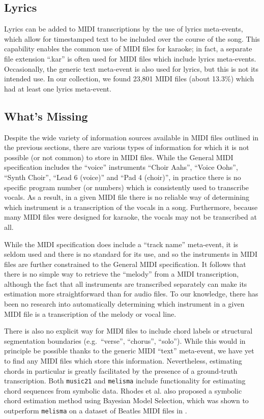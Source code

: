 \documentclass{article}
\begin{document}
\subsection{Lyrics}

Lyrics can be added to MIDI transcriptions by the use of lyrics meta-events, which allow for timestamped text to be included over the course of the song.
This capability enables the common use of MIDI files for karaoke; in fact, a separate file extension ``.kar'' is often used for MIDI files which include lyrics meta-events.
Occasionally, the generic text meta-event is also used for lyrics, but this is not its intended use.
In our collection, we found 23,801 MIDI files (about 13.3\%) which had at least one lyrics meta-event.

\subsection{What's Missing}
\label{sec:missing}

Despite the wide variety of information sources available in MIDI files outlined in the previous sections, there are various types of information for which it is not possible (or not common) to store in MIDI files.
While the General MIDI specification includes the ``voice'' instruments ``Choir Aahs'', ``Voice Oohs'', ``Synth Choir'', ``Lead 6 (voice)'' and ``Pad 4 (choir)'', in practice there is no specific program number (or numbers) which is consistently used to transcribe vocals.
As a result, in a given MIDI file there is no reliable way of determining which instrument is a transcription of the vocals in a song.
Furthermore, because many MIDI files were designed for karaoke, the vocals may not be transcribed at all.

While the MIDI specification does include a ``track name'' meta-event, it is seldom used and there is no standard for its use, and so the instruments in MIDI files are further constrained to the General MIDI specification.
It follows that there is no simple way to retrieve the ``melody'' from a MIDI transcription, although the fact that all instruments are transcribed separately can make its estimation more straightforward than for audio files.
To our knowledge, there has been no research into automatically determining which instrument in a given MIDI file is a transcription of the melody or vocal line.

There is also no explicit way for MIDI files to include chord labels or structural segmentation boundaries (e.g.\ ``verse'', ``chorus'', ``solo'').
While this would in principle be possible thanks to the generic MIDI ``text'' meta-event, we have yet to find any MIDI files which store this information.
Nevertheless, estimating chords in particular is greatly facilitated by the presence of a ground-truth transcription.
Both \texttt{music21} \cite{cuthbert2010music21} and \texttt{melisma} \cite{sleator2001melisma} include functionality for estimating chord sequences from symbolic data.
Rhodes et al.\cite{rhodes2007bayesian} also proposed a symbolic chord estimation method using Bayesian Model Selection, which was shown to outperform \texttt{melisma} on a dataset of Beatles MIDI files in \cite{ewert2012towards}.
\end{document}
